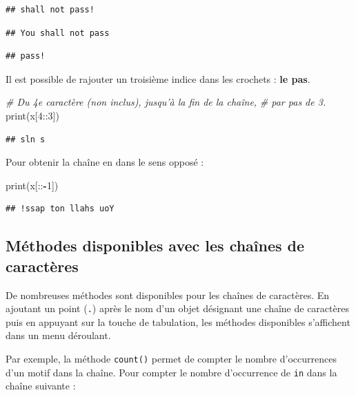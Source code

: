 \documentclass[12pt,]{book}
\newenvironment{Shaded}{\begin{snugshade}}{\end{snugshade}}
\newcommand{\DecValTok}[1]{\textcolor[rgb]{0.00,0.00,0.81}{#1}}
\newcommand{\CommentTok}[1]{\textcolor[rgb]{0.56,0.35,0.01}{\textit{#1}}}
\newcommand{\OperatorTok}[1]{\textcolor[rgb]{0.81,0.36,0.00}{\textbf{#1}}}
\newcommand{\BuiltInTok}[1]{#1}
\newcommand{\NormalTok}[1]{#1}
\numberwithin{equation}{section}
\numberwithin{countremarque}{section}
\begin{document}
\begin{lstlisting}
## shall not pass!
\end{lstlisting}

\begin{lstlisting}
## You shall not pass
\end{lstlisting}

\begin{lstlisting}
## pass!
\end{lstlisting}

Il est possible de rajouter un troisième indice dans les crochets :
\textbf{le pas}.

\begin{Shaded}
\begin{Highlighting}[]
\CommentTok{# Du 4e caractère (non inclus), jusqu'à la fin de la chaîne,}
\CommentTok{# par pas de 3.}
\BuiltInTok{print}\NormalTok{(x[}\DecValTok{4}\NormalTok{::}\DecValTok{3}\NormalTok{])}
\end{Highlighting}
\end{Shaded}

\begin{lstlisting}
## sln s
\end{lstlisting}

Pour obtenir la chaîne en dans le sens opposé :

\begin{Shaded}
\begin{Highlighting}[]
\BuiltInTok{print}\NormalTok{(x[::}\OperatorTok{-}\DecValTok{1}\NormalTok{])}
\end{Highlighting}
\end{Shaded}

\begin{lstlisting}
## !ssap ton llahs uoY
\end{lstlisting}

\subsection{Méthodes disponibles avec les chaînes de
caractères}\label{methodes-disponibles-avec-les-chaines-de-caracteres}

De nombreuses méthodes sont disponibles pour les chaînes de caractères.
En ajoutant un point (\texttt{.}) après le nom d'un objet désignant une
chaîne de caractères puis en appuyant sur la touche de tabulation, les
méthodes disponibles s'affichent dans un menu déroulant.

Par exemple, la méthode \texttt{count()} permet de compter le nombre
d'occurrences d'un motif dans la chaîne. Pour compter le nombre
d'occurrence de \texttt{in} dans la chaîne suivante :
\end{document}
